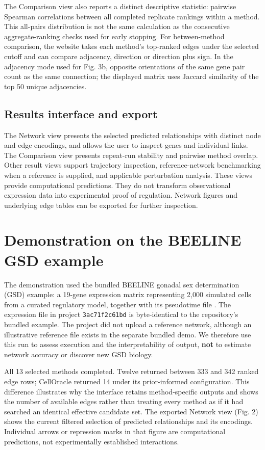 \documentclass[11pt]{article}
\begin{document}
The Comparison view also reports a distinct descriptive statistic: pairwise Spearman correlations between all completed replicate rankings within a method. This all-pairs distribution is not the same calculation as the consecutive aggregate-ranking checks used for early stopping. For between-method comparison, the website takes each method's top-ranked edges under the selected cutoff and can compare adjacency, direction or direction plus sign. In the adjacency mode used for Fig. 3b, opposite orientations of the same gene pair count as the same connection; the displayed matrix uses Jaccard similarity of the top 50 unique adjacencies.

\subsection{Results interface and export}

The Network view presents the selected predicted relationships with distinct node and edge encodings, and allows the user to inspect genes and individual links. The Comparison view presents repeat-run stability and pairwise method overlap. Other result views support trajectory inspection, reference-network benchmarking when a reference is supplied, and applicable perturbation analysis. These views provide computational predictions. They do not transform observational expression data into experimental proof of regulation. Network figures and underlying edge tables can be exported for further inspection.

\section{Demonstration on the BEELINE GSD example}

The demonstration used the bundled BEELINE gonadal sex determination (GSD) example: a 19-gene expression matrix representing 2,000 simulated cells from a curated regulatory model, together with its pseudotime file \cite{pratapa2020,beeline_docs}. The expression file in project \texttt{3ac71f2c61bd} is byte-identical to the repository's bundled example. The project did not upload a reference network, although an illustrative reference file exists in the separate bundled demo. We therefore use this run to assess execution and the interpretability of output, \textbf{not} to estimate network accuracy or discover new GSD biology.

All 13 selected methods completed. Twelve returned between 333 and 342 ranked edge rows; CellOracle returned 14 under its prior-informed configuration. This difference illustrates why the interface retains method-specific outputs and shows the number of available edges rather than treating every method as if it had searched an identical effective candidate set. The exported Network view (Fig. 2) shows the current filtered selection of predicted relationships and its encodings. Individual arrows or repression marks in that figure are computational predictions, not experimentally established interactions.
\end{document}
